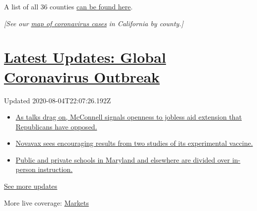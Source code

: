 A list of all 36 counties
\href{https://covid19.ca.gov/roadmap-counties/}{can be found here}.

\emph{{[}See our}
\href{https://www.nytimes3xbfgragh.onion/interactive/2020/us/california-coronavirus-cases.html}{\emph{map
of coronavirus cases}} \emph{in California by county.{]}}

\hypertarget{latest-updates-global-coronavirus-outbreak}{%
\section{\texorpdfstring{\href{https://www.nytimes3xbfgragh.onion/2020/08/04/world/coronavirus-cases.html?action=click\&pgtype=Article\&state=default\&region=MAIN_CONTENT_1\&context=storylines_live_updates}{Latest
Updates: Global Coronavirus
Outbreak}}{Latest Updates: Global Coronavirus Outbreak}}\label{latest-updates-global-coronavirus-outbreak}}

Updated 2020-08-04T22:07:26.192Z

\begin{itemize}
\tightlist
\item
  \href{https://www.nytimes3xbfgragh.onion/2020/08/04/world/coronavirus-cases.html?action=click\&pgtype=Article\&state=default\&region=MAIN_CONTENT_1\&context=storylines_live_updates\#link-2daa96b5}{As
  talks drag on, McConnell signals openness to jobless aid extension
  that Republicans have opposed.}
\item
  \href{https://www.nytimes3xbfgragh.onion/2020/08/04/world/coronavirus-cases.html?action=click\&pgtype=Article\&state=default\&region=MAIN_CONTENT_1\&context=storylines_live_updates\#link-1228a480}{Novavax
  sees encouraging results from two studies of its experimental
  vaccine.}
\item
  \href{https://www.nytimes3xbfgragh.onion/2020/08/04/world/coronavirus-cases.html?action=click\&pgtype=Article\&state=default\&region=MAIN_CONTENT_1\&context=storylines_live_updates\#link-4825b93}{Public
  and private schools in Maryland and elsewhere are divided over
  in-person instruction.}
\end{itemize}

\href{https://www.nytimes3xbfgragh.onion/2020/08/04/world/coronavirus-cases.html?action=click\&pgtype=Article\&state=default\&region=MAIN_CONTENT_1\&context=storylines_live_updates}{See
more updates}

More live coverage:
\href{https://www.nytimes3xbfgragh.onion/live/2020/08/04/business/stock-market-today-coronavirus?action=click\&pgtype=Article\&state=default\&region=MAIN_CONTENT_1\&context=storylines_live_updates}{Markets}

